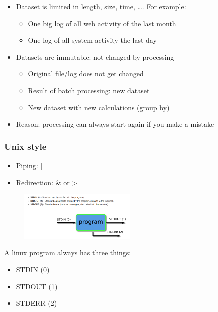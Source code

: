 \documentclass{article}
\begin{document}
\begin{itemize}
    \item Dataset is limited in length, size, time, \dots. For example:
    \begin{itemize}
        \item One big log of all web activity of the last month
        \item One log of all system activity the last day
    \end{itemize}
    \item Datasets are immutable: not changed by processing
    \begin{itemize}
        \item Original file/log does not get changed
        \item Result of batch processing: new dataset
        \item New dataset with new calculations (group by)
    \end{itemize}
    \item Reason: processing can always start again if you make a mistake
\end{itemize}

\subsubsection{Unix style}

\begin{itemize}
    \item Piping: |
    \item Redirection: \& or >
\end{itemize}

\begin{figure}[H]
    \centering
    \includegraphics[width=0.5\textwidth]{linux-std.png}
\end{figure}


A linux program always has three things:

\begin{itemize}
    \item STDIN (0)
    \item STDOUT (1)
    \item STDERR (2)
\end{itemize}
\end{document}
